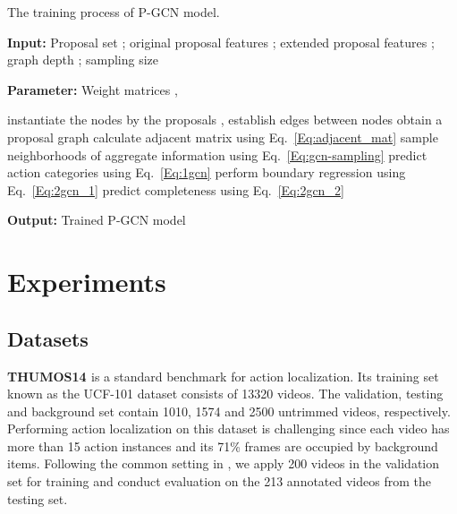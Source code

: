 \documentclass[10pt,twocolumn,letterpaper]{article}
\begin{document}
	\begin{algorithm}[!bt]
		\caption{The training process of P-GCN model.}
		\begin{flushleft}
			\textbf{Input:} Proposal set ;
			original proposal features ;
			extended proposal features ;
graph depth ; sampling size 
			\vspace{-0.3cm}
		\end{flushleft}
		\begin{flushleft}
			\textbf{Parameter:} Weight matrices , 
			\vspace{-0.3cm}
		\end{flushleft}
		\begin{algorithmic}[1]
			\State instantiate the nodes by the proposals , 
			\State establish edges between nodes
			\State obtain a proposal graph 
			\State calculate adjacent matrix using Eq.~\eqref{Eq:adjacent_mat}
			\While {not converges}
			\For {}
			\For {}
			\State sample  neighborhoods of 
			\State aggregate information using Eq.~\eqref{Eq:gcn-sampling}
			\EndFor
			\EndFor
			\State predict action categories  using Eq.~\eqref{Eq:1gcn}
			\State perform boundary regression using Eq.~\eqref{Eq:2gcn_1}
			\State predict completeness  using Eq.~\eqref{Eq:2gcn_2}
			\EndWhile
			\vspace{-0.3cm}
		\end{algorithmic}
		\begin{flushleft}
			\textbf{Output:} Trained P-GCN model
		\end{flushleft}
		\label{Alg:forward}
		\vspace{-0.4cm}
	\end{algorithm}
	
	
	
	


	
	
	
	
	
	\section{Experiments}


	\subsection{Datasets}
	\textbf{THUMOS14 \cite{jiang2014thumos}} is a standard benchmark for action localization. 
	Its training set known as the UCF-101 dataset consists of 13320 videos. The validation, testing and background set contain 1010, 1574 and 2500 untrimmed videos, respectively. Performing action localization on this dataset is challenging since each video has more than 15 action instances and its 71\% frames are occupied by background items.
Following the common setting in \cite{jiang2014thumos}, we apply 200 videos in the validation set for training and conduct evaluation on the 213 annotated videos from the testing set. 
	
\end{document}
